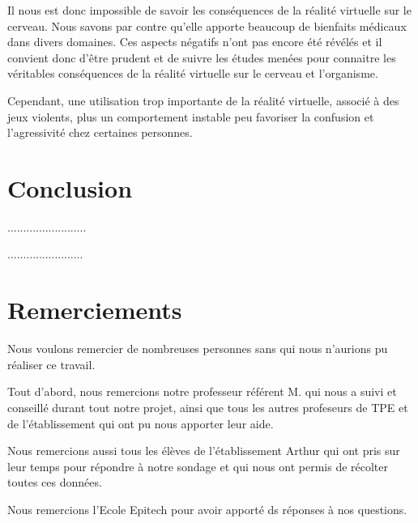 \documentclass[12pt, a4paper]{report}
\begin{document}
Il nous est donc impossible de savoir les conséquences de la réalité virtuelle sur le cerveau. Nous savons par contre qu'elle apporte beaucoup de bienfaits médicaux dans divers domaines. Ces aspects négatifs n'ont pas encore été révélés et il convient donc d'être prudent et de suivre les études menées pour connaitre les véritables conséquences de la réalité virtuelle sur le cerveau et l'organisme.

Cependant, une utilisation trop importante de la réalité virtuelle, associé à des jeux violents, plus un comportement instable peu favoriser la confusion et l'agressivité chez certaines personnes.

\vspace{2cm}
\section{Conclusion}




.........................

\vspace{9cm}





















........................


\section*{Remerciements}

Nous voulons remercier de nombreuses personnes sans qui nous n'aurions pu réaliser ce travail.

Tout d'abord, nous remercions notre professeur référent M.  qui nous a suivi et conseillé durant tout notre projet, ainsi que tous les autres profeseurs de TPE et de l'établissement qui ont pu nous apporter leur aide.

Nous remercions aussi tous les élèves de l'établissement Arthur  qui ont pris sur leur temps pour répondre à notre sondage et qui nous ont permis de récolter toutes ces données.

Nous remercions l'Ecole Epitech pour avoir apporté ds réponses à nos questions.
\end{document}
